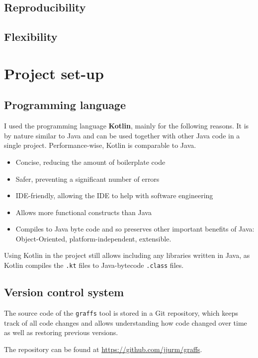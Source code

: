\subsection{Reproducibility}

\subsection{Flexibility}


\section{Project set-up}

\subsection{Programming language}

I used the programming language \textbf{Kotlin}, mainly for the following reasons.
It is by nature similar to Java and can be used together with other Java code in a single project.
Performance-wise, Kotlin is comparable to Java.
\begin{itemize}
    \item Concise, reducing the amount of boilerplate code
    \item Safer, preventing a significant number of errors
    \item IDE-friendly, allowing the IDE to help with software engineering
    \item Allows more functional constructs than Java
    \item Compiles to Java byte code and so preserves other important benefits of Java: Object-Oriented, platform-independent, extensible.
\end{itemize}

Using Kotlin in the project still allows including any libraries written in Java, as Kotlin compiles the \texttt{.kt} files to Java-bytecode \texttt{.class} files.

\subsection{Version control system}

The source code of the \texttt{graffs} tool is stored in a Git repository, which keeps track of all code changes and allows understanding how code changed over time as well as restoring previous versions.

The repository can be found at \url{https://github.com/jjurm/graffs}.


